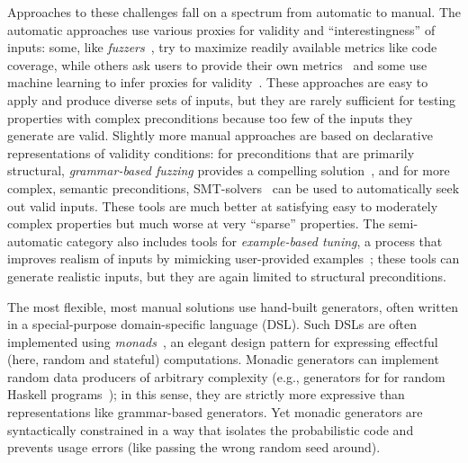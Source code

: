Approaches to these challenges
fall on a spectrum from automatic to manual. The automatic approaches use
various proxies for validity and ``interestingness'' of
inputs: some, like {\em
fuzzers}~\cite{afl-readme}, try to maximize readily available metrics like code
coverage, while others ask users to provide their own metrics~\cite{loscher2017targetedpbt} and
some use machine learning to infer proxies for
validity~\cite{godefroid2017learn, DBLP:conf/icse/ReddyLPS20}. These approaches
are easy to apply and produce diverse sets of inputs, but they are rarely
sufficient for testing properties with complex
preconditions because too few of the inputs they generate are
valid. Slightly more
manual approaches are based on declarative representations of validity
conditions: for preconditions that are primarily structural, {\em grammar-based
fuzzing} provides a compelling solution~\cite{godefroid2008grammar,
holler2012fuzzing, veggalam2016ifuzzer, wang2019superion,
srivastava2021gramatron}, and for more complex, semantic preconditions,
SMT-solvers~\cite{dewey2017automated, beginners-luck,
steinhofel_input_2022} can be used to automatically seek out valid
inputs. These tools are
much better at satisfying easy to moderately complex properties but
much worse at very ``sparse'' properties. The semi-automatic
category also includes tools for {\em example-based tuning}, a process that
improves realism of inputs by mimicking user-provided
examples~\cite{soremekun2020inputs}; these tools can generate
realistic inputs, but they are again limited to structural preconditions.

The most flexible, most manual solutions use hand-built
generators, often written in a special-purpose domain-specific language (DSL).
Such DSLs are often implemented using {\em
monads\/}~\cite{moggi1991notions}, an elegant design pattern for
expressing effectful (here, random and stateful) computations. Monadic generators can implement random data producers of arbitrary complexity
(e.g., generators for for random Haskell
programs~\cite{palka_testing_2011}); in this sense, they are strictly more expressive than
representations like grammar-based generators.  Yet monadic generators are
syntactically constrained in a way that isolates the probabilistic code and
prevents usage errors (like passing the wrong random seed around).

